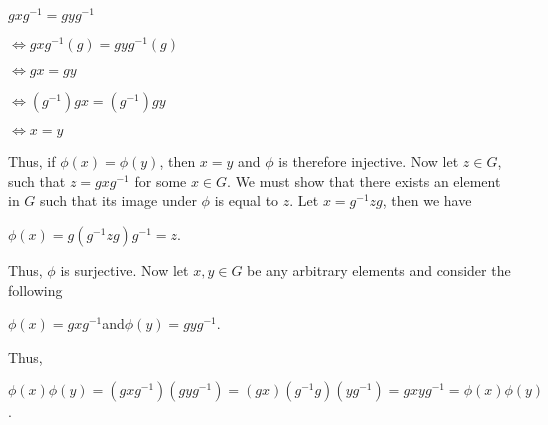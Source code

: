 \documentclass[12pt, a4paper]{article}
\begin{document}
\vspace{4mm}

\hspace{10mm} $gxg^{-1}=gyg^{-1}$

\vspace{2mm}

\hspace{18mm} $\Leftrightarrow gxg^{-1}(g)=gyg^{-1}(g)$

\newpage

\hspace{18mm} $\Leftrightarrow gx=gy$

\vspace{2mm}

\hspace{18mm} $\Leftrightarrow (g^{-1})gx=(g^{-1})gy$

\vspace{2mm}

\hspace{18mm} $\Leftrightarrow x=y$

\vspace{4mm}

    Thus, if $\phi(x)=\phi(y)$, then $x=y$ and $\phi$ is therefore injective. Now let $z\in G$, such that $z=gxg^{-1}$ for some $x\in G$. We must show that there exists an element in $G$ such that its image under $\phi$ is equal to $z$. Let $x=g^{-1}zg$, then we have\par
    
\vspace{4mm}

        \centerline{$\phi(x)=g(g^{-1}zg)g^{-1}=z$.}
        
\vspace{4mm}

    Thus, $\phi$ is surjective. Now let $x,y\in G$ be any arbitrary elements and consider the following\par
    
\vspace{4mm}

        \centerline{$\phi(x)=gxg^{-1}$\hspace{5mm}and\hspace{5mm}$\phi(y)=gyg^{-1}$.}
        
\vspace{4mm}

    Thus,
    
\vspace{4mm}

                \centerline{$\phi(x)\phi(y)=(gxg^{-1})(gyg^{-1})=(gx)(g^{-1}g)(yg^{-1})=gxyg^{-1}=\phi(x)\phi(y)$.}
                
\end{document}
